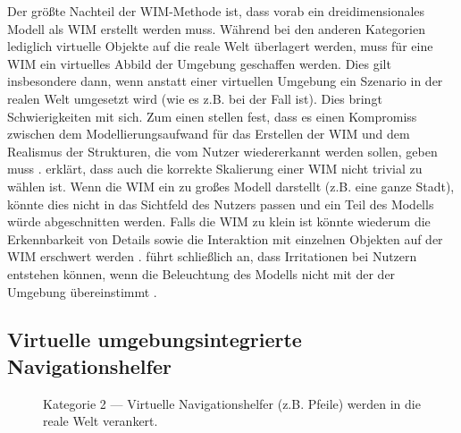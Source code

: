 Der größte Nachteil der WIM-Methode ist, dass vorab ein dreidimensionales Modell als WIM erstellt werden muss.
Während bei den anderen Kategorien lediglich virtuelle Objekte auf die reale Welt überlagert werden, muss für eine WIM ein virtuelles Abbild der Umgebung geschaffen werden.
Dies gilt insbesondere dann, wenn anstatt einer virtuellen Umgebung ein Szenario in der realen Welt umgesetzt wird (wie es z.B. bei \textcite{Mulloni2012} der Fall ist).
Dies bringt Schwierigkeiten mit sich.
Zum einen stellen \citeauthor{Mulloni2012} fest, dass es einen Kompromiss zwischen dem Modellierungsaufwand für das Erstellen der WIM und dem Realismus der Strukturen, die vom Nutzer wiedererkannt werden sollen, geben muss \parencite[215]{Mulloni2012}.
\citeauthor{Elvezio2017} erklärt, dass auch die korrekte Skalierung einer WIM nicht trivial zu wählen ist.
Wenn die WIM ein zu großes Modell darstellt (z.B. eine ganze Stadt), könnte dies nicht in das Sichtfeld des Nutzers passen und ein Teil des Modells würde abgeschnitten werden.
Falls die WIM zu klein ist könnte wiederum die Erkennbarkeit von Details sowie die Interaktion mit einzelnen Objekten auf der WIM erschwert werden \parencite[1]{Elvezio2017}.
\citeauthor{Stoakley1995} führt schließlich an, dass Irritationen bei Nutzern entstehen können, wenn die Beleuchtung des Modells nicht mit der der Umgebung übereinstimmt \parencite[269]{Stoakley1995}.

\subsection{Virtuelle umgebungsintegrierte Navigationshelfer}
\begin{figure}[ht]
    \centering
    \caption{Kategorie 2 --- Virtuelle Navigationshelfer (z.B. Pfeile) werden in die reale Welt verankert.}
    \label{fig:sketch_ar_arrows}
\end{figure}

